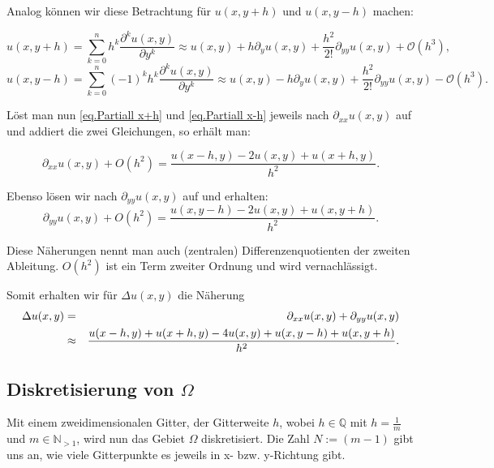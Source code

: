 Analog können wir diese Betrachtung für $u(x,y+h)$ und $u(x,y-h)$ machen:

\begin{equation}
u(x,y+h) = \sum_{k = 0}^{n} h^{k} \frac {\partial^{k}u(x,y)} {\partial y^{k}} \approx u(x,y) + h \partial_{y} u(x,y) + \frac {h^{2}} {2!} \partial_{yy} u(x,y) + \mathcal{O}(h^{3}),
\end{equation}
\begin{equation}
u(x,y-h) = \sum_{k = 0}^{n} (-1)^{k} h^{k} \frac {\partial^{k}u(x,y)} {\partial y^{k}} \approx u(x,y) - h \partial_{y} u(x,y) + \frac {h^{2}} {2!} \partial_{yy} u(x,y) - \mathcal{O}(h^{3}).
\end{equation}

Löst man nun \autoref{eq.Partiall x+h} und \autoref{eq.Partiall x-h} jeweils nach $\partial_{xx} u(x,y)$ auf und addiert die zwei Gleichungen, so erhält man:

\begin{equation}
\partial_{xx} u(x,y) + O(h^{2}) = \frac {u(x-h,y) - 2u(x,y) + u(x+h,y)} {h^{2}}.
\end{equation}

Ebenso lösen wir nach $\partial_{yy} u(x,y)$ auf und erhalten:
\begin{equation}
\partial_{yy} u(x,y) + O(h^{2}) = \frac {u(x,y-h) - 2u(x,y) + u(x,y+h)} {h^{2}}.
\end{equation}

Diese Näherungen nennt man auch (zentralen) Differenzenquotienten der zweiten Ableitung. $O(h^{2})$ ist ein Term zweiter Ordnung und wird vernachlässigt.

Somit erhalten wir für $\Delta u(x,y)$ die Näherung
\begin{eqnarray}
\Delta u(x,y) &=& \partial_{xx} u(x,y) + \partial_{yy} u(x,y) \notag \\
&\approx& \frac {u(x-h,y) + u(x+h,y) - 4u(x,y) + u(x,y-h) + u(x,y+h)} {h^{2}}.\label{eq.Differenzenquotienten}
\end{eqnarray}

\subsection{Diskretisierung von $\Omega$}\label{ss.Diskretisierung}

Mit einem zweidimensionalen Gitter, der Gitterweite $h$, wobei $h \in \mathbb{Q}$ mit $h = \frac {1} {m}$ und $m \in \mathbb{N}_{>1}$, wird nun das Gebiet $\Omega$ diskretisiert. Die Zahl $N := (m-1)$ gibt uns an, wie viele Gitterpunkte es jeweils in x- bzw. y-Richtung gibt.\\

